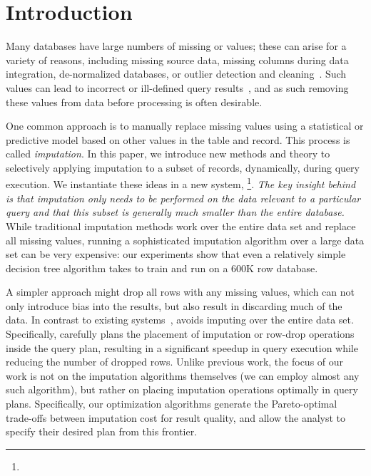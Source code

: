 \section{Introduction}

Many databases have large numbers of missing or \nullv{} values;  these can arise for a
variety of reasons, including missing source data,
missing columns during data integration, de-normalized databases, or outlier detection and
cleaning~\cite{kim2003}.  Such \nullv{} values can lead to incorrect or ill-defined query results~\cite{rubin1976}, and as such removing these values from data
before processing is often desirable.

One common approach is to manually replace missing values using a statistical or predictive model based on other values in the table and record.
This process is called \emph{imputation}.
In this paper, we introduce new methods and theory to selectively applying
imputation to a subset of records, dynamically, during query execution.
We instantiate these ideas in a new system, \ProjectName{}\footnote{\ProjectUrl{}}.  \emph{The key insight behind \ProjectName{} is that imputation
only needs to be performed on the data relevant to a particular query and
that this subset is generally much smaller than the entire database.}  
While traditional imputation methods work over the entire data set and replace all missing
values, running a sophisticated imputation algorithm over a large data set can be very
expensive: our experiments show that even a relatively simple decision tree algorithm takes \acsbaseresulthours{} to train and run
on a 600K row database.

A simpler approach might drop all rows with any missing values, which can not only introduce
bias into the results, but also result in discarding much of the data.
In contrast to existing systems~\cite{burgette2010multiple,akande2015empirical}, \ProjectName{} avoids imputing over the entire data set. Specifically, \ProjectName{}
carefully plans the placement of imputation or row-drop operations inside the query plan, resulting in a 
significant speedup in query execution while reducing the number of dropped rows. Unlike previous work, the focus of our work is not on the imputation algorithms themselves (we can employ almost any such algorithm), but rather on placing imputation operations
optimally in query plans.   Specifically, our optimization algorithms generate the
Pareto-optimal trade-offs between imputation cost for result quality,
and allow the analyst to specify their desired plan from this frontier.


